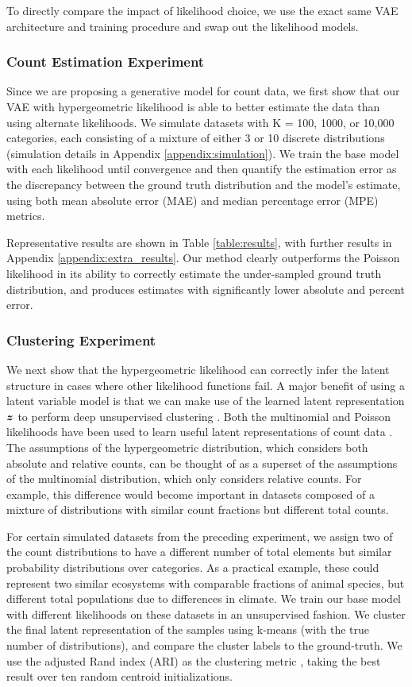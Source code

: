 \documentclass{article}
\theoremstyle{plain}
\theoremstyle{definition}
\theoremstyle{remark}
\begin{document}
To directly compare the impact of likelihood choice, we use the exact same VAE architecture and training procedure and swap out the likelihood models.

\subsubsection{Count Estimation Experiment}
Since we are proposing a generative model for count data, we first show that our VAE with hypergeometric likelihood is able to better estimate the data than using alternate likelihoods. We simulate datasets with K = 100, 1000, or 10,000 categories, each consisting of a mixture of either 3 or 10 discrete distributions (simulation details in Appendix \ref{appendix:simulation}). We train the base model with each likelihood until convergence and then quantify the estimation error as the discrepancy between the ground truth distribution and the model's estimate, using both mean absolute error (MAE) and median percentage error (MPE) metrics.

Representative results are shown in Table \ref{table:results}, with further results in Appendix \ref{appendix:extra_results}. Our method clearly outperforms the Poisson likelihood in its ability to correctly estimate the under-sampled ground truth distribution, and produces estimates with significantly lower absolute and percent error.

\subsubsection{Clustering Experiment}
We next show that the hypergeometric likelihood can correctly infer the latent structure in cases where other likelihood functions fail. A major benefit of using a latent variable model is that we can make use of the learned latent representation ${\bm{z}}$ to perform deep unsupervised clustering \cite{lim2020deep}. Both the multinomial and Poisson likelihoods have been used to learn useful latent representations of count data \cite{bouguila2010count}. The assumptions of the hypergeometric distribution, which considers both absolute and relative counts, can be thought of as a superset of the assumptions of the multinomial distribution, which only considers relative counts. For example, this difference would become important in datasets composed of a mixture of distributions with similar count fractions but different total counts.

For certain simulated datasets from the preceding experiment, we assign two of the count distributions to have a different number of total elements but similar probability distributions over categories. As a practical example, these could represent two similar ecosystems with comparable fractions of animal species, but different total populations due to differences in climate. We train our base model with different likelihoods on these datasets in an unsupervised fashion. We cluster the final latent representation of the samples using k-means (with the true number of distributions), and compare the cluster labels to the ground-truth. We use the adjusted Rand index (ARI) as the clustering metric \citep{santos2009use}, taking the best result over ten random centroid initializations.
\end{document}
